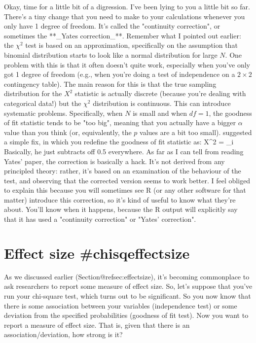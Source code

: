 Okay, time for a little bit of a digression. I've been lying to you a little bit so far. There's a tiny change that you need to make to your calculations whenever you only have 1 degree of freedom. It's called the "continuity correction", or sometimes the **_Yates correction_**. Remember what I pointed out earlier: the $\chi^2$ test is based on an approximation, specifically on the assumption that binomial distribution starts to look like a normal distribution for large $N$. One problem with this is that it often doesn't quite work, especially when you've only got 1 degree of freedom (e.g., when you're doing a test of independence on a $2 \times 2$ contingency table). The main reason for this is that the true sampling distribution for the $X^2$ statistic is actually discrete (because you're dealing with categorical data!) but the $\chi^2$ distribution is continuous. This can introduce systematic problems. Specifically, when $N$ is small and when $df=1$, the goodness of fit statistic tends to be "too big", meaning that you actually have a bigger $\alpha$ value than you think (or, equivalently, the $p$ values are a bit too small).  suggested a simple fix, in which you redefine the goodness of fit statistic as:
\be
X^2 = \sum_{i} 
\ee
Basically, he just subtracts off 0.5 everywhere. As far as I can tell from reading Yates' paper, the correction is basically a hack. It's not derived from any principled theory: rather, it's based on an examination of the behaviour of the test, and observing that the corrected version seems to work better. I feel obliged to explain this because you will sometimes see R (or any other software for that matter) introduce this correction, so it's kind of useful to know what they're about. You'll know when it happens, because the R output will explicitly say that it has used a "continuity correction" or "Yates' correction".


\section{Effect size {#chisqeffectsize}}

As we discussed earlier (Section@refsec:effectsize), it's becoming commonplace to ask researchers to report some measure of effect size. So, let's suppose that you've run your chi-square test, which turns out to be significant. So you now know that there is some association between your variables (independence test) or some deviation from the specified probabilities (goodness of fit test). Now you want to report a measure of effect size. That is, given that there is an association/deviation, how strong is it?

